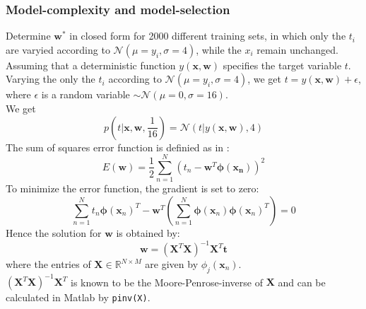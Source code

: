 \documentclass[a4]{article}
\begin{document}
\subsubsection{Model-complexity and model-selection}
Determine ${\mathbf w}^*$ in closed form for 2000 different training sets, in which only the $t_i$ are varyied according to $\mathcal{N}(\mu = y_i,\sigma = 4)$, while the $x_i$ remain unchanged. \\
Assuming that a deterministic function $y(\mathbf{x}, \mathbf{w})$ specifies the target variable $t$. Varying the only the $t_i$ according to $\mathcal{N}(\mu = y_i,\sigma = 4)$, we get $t=y(\mathbf{x}, \mathbf{w}) + \epsilon$, where $\epsilon$ is a random variable $\sim \mathcal{N}(\mu = 0,\sigma = 16)$.\\
We get
$$p(t| \mathbf{x}, \mathbf{w}, \frac{1}{16}) = \mathcal{N}(t|y(\mathbf{x}, \mathbf{w}), 4)$$
The sum of squares error function is definied as in \cite{Bishop}:
$$E(\mathbf{w})=\frac{1}{2} \sum_{n=1} ^N (t_n- \mathbf{w}^T \mathbf{\phi}(\mathbf{x_n}))^2$$
To minimize the error function, the gradient is set to zero:
$$\sum_{n=1}^N t_n \mathbf{\phi}(\mathbf{x}_n)^T- \mathbf{w}^T \left( \sum_{n=1} ^N \mathbf{\phi} ( \mathbf{x}_n) \mathbf{\phi} ( \mathbf{x}_n)^T \right)=0$$
Hence the solution for $\mathbf{w}$ is obtained by:
$$ \mathbf{w}=(\mathbf{X}^T\mathbf{X})^{-1}\mathbf{X}^T\mathbf{t}$$
where the entries of $\mathbf{X} \in \mathbb{R}^{N \times M}$ are given by $\phi_j(\mathbf{x}_n)$. \\
$(\mathbf{X}^T\mathbf{X})^{-1}\mathbf{X}^T$ is known to be the Moore-Penrose-inverse of $\mathbf{X}$ and can be calculated in Matlab by \verb+pinv(X)+. \\
\end{document}
